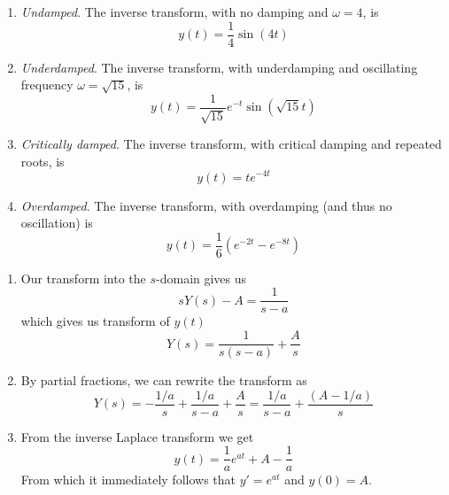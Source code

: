 \documentclass[a4paper]{article}
\begin{document}
\begin{enumerate}[label=\arabic*.]
	\item \textit{Undamped}. The inverse transform, with no damping and \( \omega = 4 \), is
	\[
		y \!\left( t  \right) = \frac{1}{4}\sin\!\left(4t\right) 
	\]
	\item \textit{Underdamped}. The inverse transform, with underdamping and oscillating frequency \( \omega = \sqrt{15} \), is
	\[
		y \!\left( t  \right) =  \frac{1}{\sqrt{15}}e^{-t }\sin\!\left(\sqrt{15} t \right) 
	\]
	\item \textit{Critically damped}. The inverse transform, with critical damping and repeated roots, is
	\[
		y \!\left( t  \right) = te^{-4t} 
	\]
	\item \textit{Overdamped}. The inverse transform, with overdamping (and thus no oscillation) is
	\[
		 y \!\left( t  \right) = \frac{1}{6}\!\left( e^{-2t} - e^{-8t} \right)
	\]
\end{enumerate}


\begin{enumerate}[label=(\alph*)]
	\item Our transform into the \( s \)-domain gives us
	\[
		sY \!\left( s  \right) - A = \frac{1}{s - a}
	\]
	which gives us transform of \( y \!\left( t  \right) \)
	\[
		Y \!\left( s  \right) = \frac{1}{s \!\left( s - a  \right)} + \frac{A }{s }
	\]
	\item By partial fractions, we can rewrite the transform as 
	\[
		Y \!\left( s \right) = -\frac{1/a}{s} + \frac{1/a}{s - a} + \frac{A }{s } = \frac{1/a }{s - a } + \frac{\!\left( A - 1/a  \right)}{s}
	\]
	\item From the inverse Laplace transform we get
	\[
		y \!\left( t  \right) = \frac{1}{a }e^{at } + A - \frac{1}{a} 
	\]
	From which it immediately follows that \( y' = e^{at } \) and \( y \!\left( 0 \right) = A  \).
\end{enumerate}
\end{document}
